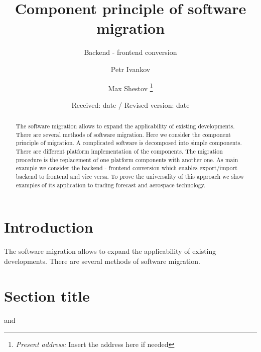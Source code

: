 \documentclass[global,referee]{svjour}
\begin{document}
%
\title{Component principle of software migration}
\subtitle{Backend - frontend conversion}
\author{Petr Ivankov \and Max Shestov%
\thanks{\emph{Present address:} Insert the address here if needed}%
}                     %
%
\offprints{}          %
%
%
\date{Received: date / Revised version: date}
%
\maketitle
%
\begin{abstract}
The software migration  allows to expand the applicability of existing developments. There are several methods of software migration. Here we consider the component principle of migration. A complicated software is decomposed into simple components. There are different platform implementation of the components. The migration procedure  is the replacement of one platform  components with another one. As main example we consider the backend - frontend conversion which enables export/import backend to frontend and vice versa. To prove the universality of this approach we show examples of its application to trading forecast and aerospace technology.
\end{abstract}
%
\section{Introduction}
\label{intro}
	The software migration  allows to expand the applicability of existing developments. There are several methods of software migration.
\section{Section title}
\label{sec:1}
and \cite{RefJ}
\end{document}
